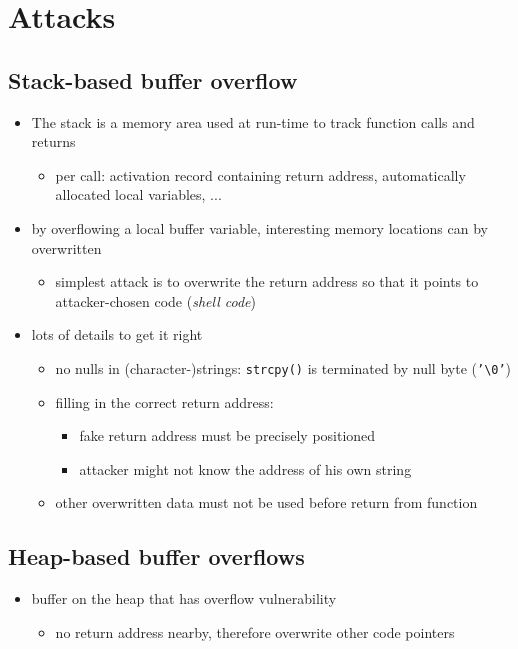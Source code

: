 \documentclass[12pt,titlepage,a4paper]{report}
\begin{document}
	\section{Attacks}
	\subsection{Stack-based buffer overflow}
	\begin{itemize}
		\item The stack is a memory area used at run-time to track function calls and returns
		\begin{itemize}
			\item per call: activation record containing return address, automatically allocated local variables, ...
		\end{itemize}
		\item by overflowing a local buffer variable, interesting memory locations can by overwritten
		\begin{itemize}
			\item simplest attack is to overwrite the return address so that it points to attacker-chosen code (\emph{shell code})
		\end{itemize}
		\item lots of details to get it right
		\begin{itemize}
			\item no nulls in (character-)strings: {\texttt{strcpy()} is terminated by null byte (\texttt{'\textbackslash0'})}
			\item filling in the correct return address:
			\begin{itemize}
				\item fake return address must be precisely positioned
				\item attacker might not know the address of his own string
			\end{itemize}
			\item other overwritten data must not be used before return from function
		\end{itemize}
	\end{itemize}

	\subsection{Heap-based buffer overflows}
	\begin{itemize}
		\item buffer on the heap that has overflow vulnerability
		\begin{itemize}
			\item no return address nearby, therefore overwrite other code pointers
		\end{itemize}
	\end{itemize}
	
\end{document}
